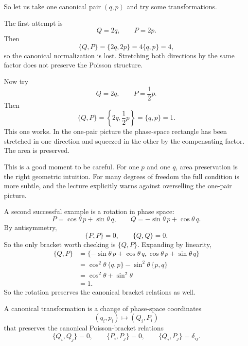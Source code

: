 So let us take one canonical pair \((q,p)\) and try some transformations.

The first attempt is
\begin{equation}
Q=2q,\qquad P=2p.
\end{equation}
Then
\begin{equation}
\{Q,P\}=\{2q,2p\}=4\{q,p\}=4,
\end{equation}
so the canonical normalization is lost. Stretching both directions by the same factor does not preserve the Poisson structure.

Now try
\begin{equation}
Q=2q,\qquad P=\frac12 p.
\end{equation}
Then
\begin{equation}
\{Q,P\}=\left\{2q,\frac12 p\right\}=\{q,p\}=1.
\end{equation}
This one works. In the one-pair picture the phase-space rectangle has been stretched in one direction and squeezed in the other by the compensating factor. The area is preserved.

This is a good moment to be careful. For one \(p\) and one \(q\), area preservation is the right geometric intuition. For many degrees of freedom the full condition is more subtle, and the lecture explicitly warns against overselling the one-pair picture.

A second successful example is a rotation in phase space:
\begin{equation}
P=\cos\theta\,p+\sin\theta\,q,\qquad
Q=-\sin\theta\,p+\cos\theta\,q.
\end{equation}
By antisymmetry,
\[
\{P,P\}=0,\qquad \{Q,Q\}=0.
\]
So the only bracket worth checking is \(\{Q,P\}\). Expanding by linearity,
\begin{align}
\{Q,P\}
&=\{-\sin\theta\,p+\cos\theta\,q,\cos\theta\,p+\sin\theta\,q\} \\
&=\cos^2\theta\,\{q,p\}-\sin^2\theta\,\{p,q\} \\
&=\cos^2\theta+\sin^2\theta \\
&=1.
\end{align}
So the rotation preserves the canonical bracket relations as well.

\begin{definition}
A canonical transformation is a change of phase-space coordinates
\[
(q_i,p_i)\longmapsto (Q_i,P_i)
\]
that preserves the canonical Poisson-bracket relations
\[
\{Q_i,Q_j\}=0,\qquad \{P_i,P_j\}=0,\qquad \{Q_i,P_j\}=\delta_{ij}.
\]
\end{definition}

